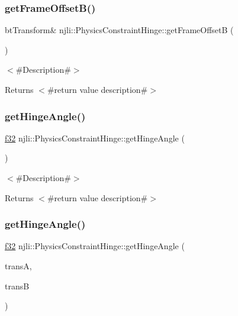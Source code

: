 \subsubsection{\texorpdfstring{get\+Frame\+Offset\+B()}{getFrameOffsetB()}}
{\footnotesize\ttfamily bt\+Transform\& njli\+::\+Physics\+Constraint\+Hinge\+::get\+Frame\+OffsetB (\begin{DoxyParamCaption}{ }\end{DoxyParamCaption})}

$<$\#\+Description\#$>$

\begin{DoxyReturn}{Returns}
$<$\#return value description\#$>$ 
\end{DoxyReturn}
\mbox{\label{classnjli_1_1_physics_constraint_hinge_a25fd1c88775b227aeda9b5f6aeae2a31}} 
\subsubsection{\texorpdfstring{get\+Hinge\+Angle()}{getHingeAngle()}\hspace{0.1cm}{\footnotesize\ttfamily [1/2]}}
{\footnotesize\ttfamily \mbox{\hyperlink{_util_8h_a5f6906312a689f27d70e9d086649d3fd}{f32}} njli\+::\+Physics\+Constraint\+Hinge\+::get\+Hinge\+Angle (\begin{DoxyParamCaption}{ }\end{DoxyParamCaption})}

$<$\#\+Description\#$>$

\begin{DoxyReturn}{Returns}
$<$\#return value description\#$>$ 
\end{DoxyReturn}
\mbox{\label{classnjli_1_1_physics_constraint_hinge_a1cd6383e545ad3a933f4be9a2ffc7507}} 
\subsubsection{\texorpdfstring{get\+Hinge\+Angle()}{getHingeAngle()}\hspace{0.1cm}{\footnotesize\ttfamily [2/2]}}
{\footnotesize\ttfamily \mbox{\hyperlink{_util_8h_a5f6906312a689f27d70e9d086649d3fd}{f32}} njli\+::\+Physics\+Constraint\+Hinge\+::get\+Hinge\+Angle (\begin{DoxyParamCaption}\item[{const bt\+Transform \&}]{transA,  }\item[{const bt\+Transform \&}]{transB }\end{DoxyParamCaption})}

